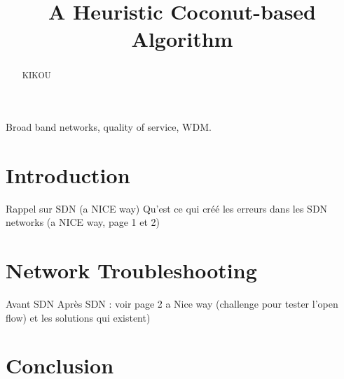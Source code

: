 \documentclass[10pt,draftcls]{IEEEtran}
\begin{document}
\title{A Heuristic Coconut-based Algorithm}


\maketitle
\begin{abstract}
KIKOU
\end{abstract}

\begin{IEEEkeywords}
Broad band networks, quality of service, WDM.
\end{IEEEkeywords}

\section{Introduction}
Rappel sur SDN (a NICE way)
Qu'est ce qui créé les erreurs dans les SDN networks (a NICE way, page 1 et 2)

\section{Network Troubleshooting}
Avant SDN
Après SDN : voir page 2 a Nice way (challenge pour tester l'open flow) et les solutions qui existent)

\section{}

\section{Conclusion}


\nocite{*}


\end{document}
